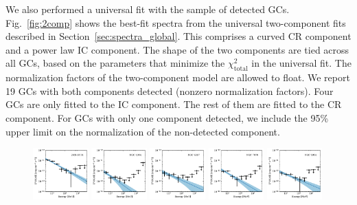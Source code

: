 \documentclass[doublespace,nopageskip]{VTthesis} %
\begin{document}
\begin{appendices}
We also performed a universal fit with the sample of detected GCs. Fig.~\ref{fig:2comp} shows the best-fit spectra from the universal two-component fits described in Section~\ref{sec:spectra_global}. This comprises a curved CR component and a power law IC component. The shape of the two components are tied across all GCs, based on the parameters that minimize the $\chi^2_\mathrm{total}$ in the universal fit. The normalization factors of the two-component model are allowed to float. We report 19 GCs with both components detected (nonzero normalization factors). Four GCs are only fitted to the IC component. The rest of them are fitted to the CR component. For GCs with only one component detected, we include the 95\% upper limit on the normalization of the non-detected component.

\begin{figure}
\centering
\includegraphics[width=0.19\textwidth]{Figures/Globular/spectra/PL_spectrum_0.pdf}
\includegraphics[width=0.19\textwidth]{Figures/Globular/spectra/PL_spectrum_4.pdf}
\includegraphics[width=0.19\textwidth]{Figures/Globular/spectra/PL_spectrum_16.pdf}
\includegraphics[width=0.19\textwidth]{Figures/Globular/spectra/PL_spectrum_26.pdf}
\includegraphics[width=0.19\textwidth]{Figures/Globular/spectra/PL_spectrum_7.pdf}

\end{figure}
\end{appendices}
\end{document}
